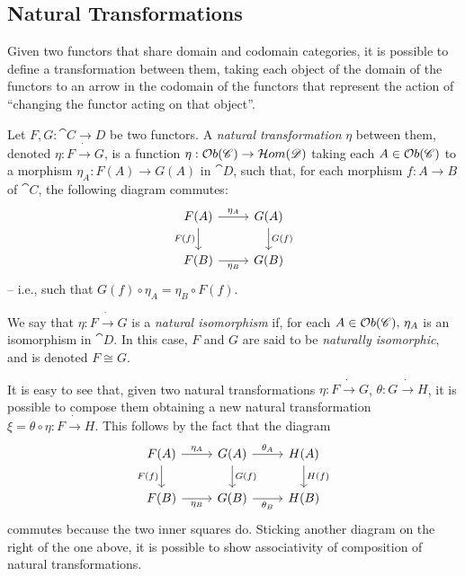 \subsection{Natural Transformations}

Given two functors that share domain and codomain categories, it is possible to define a transformation between them, taking each object of the domain of the functors to an arrow in the codomain of the functors that represent the action of ``changing the functor acting on that object''.

\begin{definition}
    Let $F,G : \cat {C \rightarrow D}$ be two functors. A \emph{natural transformation} $\eta$ between them, denoted $\eta: F \dot\rightarrow G$, is a function $\eta: \mathcal{O}b(\mathscr{C}) \rightarrow \mathcal{H}om(\mathscr{D})$ taking each $A \in \mathcal{O}b(\mathscr{C})$ to a morphism $\eta_A:F(A) \rightarrow G(A)$ in $\cat{D}$, such that, for each morphism $f: A \rightarrow B$ of $\cat C$, the following diagram commutes:
    \[
        \begin{tikzcd}
            F(A) \arrow[d, "F(f)" swap] \arrow[r, "{\eta_A}"] & G(A) \arrow[d, "G(f)"] \\
            F(B) \arrow[r, "{\eta_B}"swap] & G(B)
        \end{tikzcd}
    \]
    -- i.e., such that $G(f) \circ \eta_A = \eta_B \circ F(f)$.

    We say that $\eta: F \dot\rightarrow G$ is a \emph{natural isomorphism} if, for each $A \in \mathcal{O}b(\mathscr{C}) \text{, } \eta_A$ is an isomorphism in $\cat D$. In this case, $F$ and $G$ are said to be \emph{naturally isomorphic}, and is denoted $F \cong G$.    
\end{definition}

\begin{obs}\label{obs:comp_assoc_nat_tran}
It is easy to see that, given two natural transformations $\eta:F\dot\rightarrow G$, $\theta: G \dot\rightarrow H$, it is possible to compose them obtaining a new natural transformation $\xi = \theta \circ \eta : F \dot \rightarrow H$. This follows by the fact that the diagram
\[
        \begin{tikzcd}
            F(A) \arrow[d, "F(f)" swap] \arrow[r, "{\eta_A}"] 
                & G(A) \arrow[d, "G(f)"] \arrow[r, "{\theta_A}"]
                & H(A) \arrow[d, "H(f)"] \\
            F(B) \arrow[r, "{\eta_B}"swap]
                & G(B) \arrow[r, "{\theta_B}" swap]
                & H(B)
        \end{tikzcd}
\]
commutes because the two inner squares do. Sticking another diagram on the right of the one above, it is possible to show associativity of composition of natural transformations.
\end{obs}

